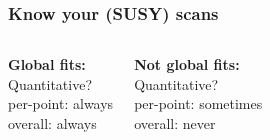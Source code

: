 \documentclass[xcolor=dvipsnames]{beamer}
\begin{document}
\begin{frame}
\frametitle{Know your (SUSY) scans}

\begin{columns}[c]
\textbf{Global fits:}\\
\footnotesize\vspace{2mm}
Quantitative?\\
\hspace{2mm}per-point: always\\
\hspace{2mm}overall: always\vspace{15mm}

\textbf{Not global fits:}\\
\footnotesize\vspace{2mm}
Quantitative?\\
\hspace{2mm}per-point: sometimes\\
\hspace{2mm}overall: never\vspace{5mm}



\end{columns}
\end{frame}
\end{document}
